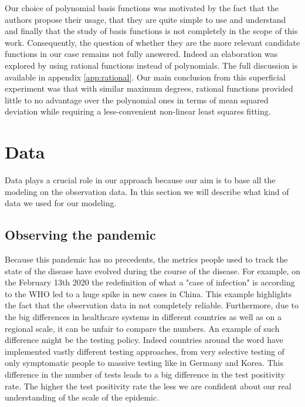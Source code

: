 \documentclass[12pt, letterpaper]{article}
\begin{document}
Our choice of polynomial basis functions was motivated by the fact that the authors propose their usage, that they are quite simple to use and understand and finally that the study of basis functions is not completely in the scope of this work. 
Consequently, the question of whether they are the more relevant candidate functions in our case remains not fully answered. 
Indeed an elaboration was explored by using rational functions instead of polynomials. 
The full discussion is available in appendix \ref{app:rational}.
Our main conclusion from this superficial experiment was that with similar maximum degrees, rational functions provided little to no advantage over the polynomial ones in terms of mean squared deviation while requiring a less-convenient non-linear least squares fitting.



\section{Data}\label{sec:data}

Data plays a crucial role in our approach because our aim is to base all the modeling on the observation data.
In this section we will describe what kind of data we used for our modeling.

\subsection{Observing the pandemic}\label{sec:jhu}

Because this pandemic has no precedents, the metrics people used to track the state of the disease have evolved during the course of the disease. 
For example, on the February 13th 2020 the redefinition of what a "case of infection" is according to the WHO led to a huge spike in new cases in China. 
This example highlights the fact that the observation data in not completely reliable. 
Furthermore, due to the big differences in healthcare systems in different countries as well as on a regional scale, it can be unfair to compare the numbers. 
An example of such difference might be the testing policy. 
Indeed countries around the word have implemented vastly different testing approaches, from very selective testing of only symptomatic people to massive testing like in Germany and Korea. This difference in the number of tests leads to a big difference in the test positivity rate. The higher the test positivity rate the less we are confident about our real understanding of the scale of the epidemic.
\end{document}
